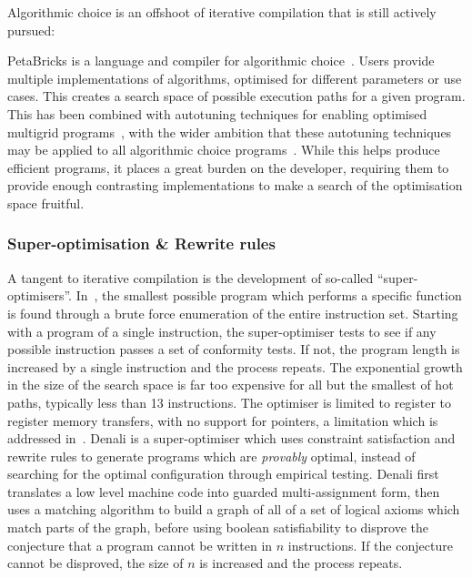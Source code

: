 Algorithmic choice is an offshoot of iterative compilation that is still actively pursued:

PetaBricks is a language and compiler for algorithmic choice~\cite{Ansel2009a}. Users provide multiple implementations of algorithms, optimised for different parameters or use cases. This creates a search space of possible execution paths for a given program. This has been combined with autotuning techniques for enabling optimised multigrid programs~\cite{Chan2009}, with the wider ambition that these autotuning techniques may be applied to all algorithmic choice programs~\cite{Ansel2014}. While this helps produce efficient programs, it places a great burden on the developer, requiring them to provide enough contrasting implementations to make a search of the optimisation space fruitful.


\subsubsection{Super-optimisation \& Rewrite rules}

A tangent to iterative compilation is the development of so-called ``super-optimisers''. In~\cite{Massalin1987}, the smallest possible program which performs a specific function is found through a brute force enumeration of the entire instruction set. Starting with a program of a single instruction, the super-optimiser tests to see if any possible instruction passes a set of conformity tests. If not, the program length is increased by a single instruction and the process repeats. The exponential growth in the size of the search space is far too expensive for all but the smallest of hot paths, typically less than 13 instructions. The optimiser is limited to register to register memory transfers, with no support for pointers, a limitation which is addressed in~\cite{Joshi2002}. Denali is a super-optimiser which uses constraint satisfaction and rewrite rules to generate programs which are \emph{provably} optimal, instead of searching for the optimal configuration through empirical testing. Denali first translates a low level machine code into guarded multi-assignment form, then uses a matching algorithm to build a graph of all of a set of logical axioms which match parts of the graph, before using boolean satisfiability to disprove the conjecture that a program cannot be written in $n$ instructions. If the conjecture cannot be disproved, the size of $n$ is increased and the process repeats.


